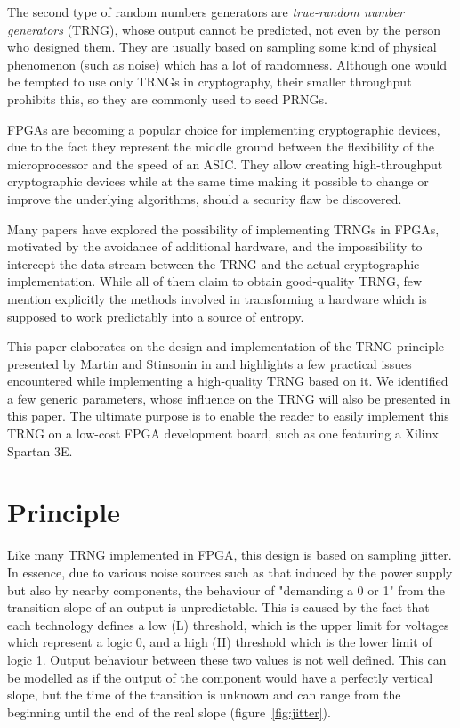 \documentclass[conference]{IEEEtran}
\begin{document}
The second type of random numbers generators are \emph{true-random number generators} (TRNG), whose output cannot be predicted, not even by the person who designed them. They are usually based on sampling some kind of physical phenomenon (such as noise) which has a lot of randomness. Although one would be tempted to use only TRNGs in cryptography, their smaller throughput prohibits this, so they are commonly used to seed PRNGs.

FPGAs are becoming a popular choice for implementing cryptographic devices, due to the fact they represent the middle ground between the flexibility of the microprocessor and the speed of an ASIC. They allow creating high-throughput cryptographic devices while at the same time making it possible to change or improve the underlying algorithms, should a security flaw be discovered.

Many papers \cite{Ko04}\cite{Su06}\cite{Sc06}\cite{Ts03}\cite{Si05} have explored the possibility of implementing TRNGs in FPGAs, motivated by the avoidance of additional hardware, and the impossibility to intercept the data stream between the TRNG and the actual cryptographic implementation. While all of them claim to obtain good-quality TRNG, few mention explicitly the methods involved in transforming a hardware which is supposed to work predictably into a source of entropy.

This paper elaborates on the design and implementation of the TRNG principle presented by Martin and Stinsonin in \cite{Su06} and highlights a few practical issues encountered while implementing a high-quality TRNG based on it. We identified a few generic parameters, whose influence on the TRNG will also be presented in this paper. The ultimate purpose is to enable the reader to easily implement this TRNG on a low-cost FPGA development board, such as one featuring a Xilinx Spartan 3E.

\section{Principle}

Like many TRNG implemented in FPGA, this design is based on sampling jitter. In essence, due to various noise sources such as that induced by the power supply but also by nearby components, the behaviour of "demanding a 0 or 1" from the transition slope of an output is unpredictable. This is caused by the fact that each technology defines a low (L) threshold, which is the upper limit for voltages which represent a logic 0, and a high (H) threshold which is the lower limit of logic 1. Output behaviour between these two values is not well defined. This can be modelled as if the output of the component would have a perfectly vertical slope, but the time of the transition is unknown and can range from the beginning until the end of the real slope (figure~\ref{fig:jitter}).
\end{document}
